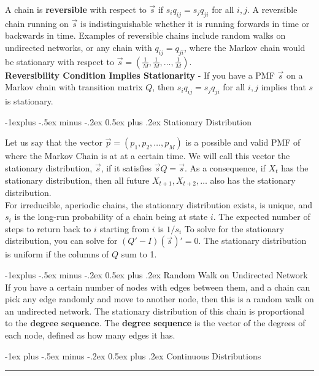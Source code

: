 \documentclass[10pt,landscape]{article}
\makeatletter
\renewcommand{\section}{\@startsection{section}{1}{0mm}%
                                {-1ex plus -.5ex minus -.2ex}%
                                {0.5ex plus .2ex}%
                                {\normalfont\large\bfseries}}
\renewcommand{\subsection}{\@startsection{subsection}{2}{0mm}%
                                {-1explus -.5ex minus -.2ex}%
                                {0.5ex plus .2ex}%
                                {\normalfont\normalsize\bfseries}}
\makeatother
\begin{document}
\begin{multicols}{3}
A chain is \textbf{reversible} with respect to $\vec{s}$ if $s_iq_{ij} = s_jq_{ji}$ for all $i, j$.  A reversible chain running on $\vec{s}$ is indistinguishable whether it is running forwards in time or backwards in time. Examples of reversible chains include random walks on undirected networks, or any chain with $q_{ij} = q_{ji}$, where the Markov chain would be stationary with respect to $\vec{s} = (\frac{1}{M}, \frac{1}{M}, \dots, \frac{1}{M})$. \\

\textbf{Reversibility Condition Implies Stationarity} - If you have a PMF $\vec{s}$ on a Markov chain with transition matrix $Q$, then $s_iq_{ij} = s_jq_{ji}$ for all $i, j$ implies that $s$ is stationary.


\subsection{Stationary Distribution}

Let us say that the vector $\vec{p} = (p_1, p_2, \dots, p_M)$ is a possible and valid PMF of where the Markov Chain is at at a certain time. We will call this vector the stationary distribution, $\vec{s}$, if it satisfies $\vec{s}Q = \vec{s}$. As a consequence, if $X_t$ has the stationary distribution, then all future $X_{t+1}, X_{t + 2}, \dots$ also has the stationary distribution. \\

For irreducible, aperiodic chains, the stationary distribution exists, is unique, and $s_i$ is the long-run probability of a chain being at state $i$. The expected number of steps to return back to $i$ starting from $i$ is $1/s_i$ To solve for the stationary distribution, you can solve for $(Q' - I)(\vec{s})' = 0$. The stationary distribution is uniform if the columns of $Q$ sum to 1.


\subsection{Random Walk on Undirected Network}
If you have a certain number of nodes with edges between them, and a chain can pick any edge randomly and move to another node, then this is a random walk on an undirected network. The stationary distribution of this chain is proportional to the $\textbf{degree sequence}.$ The \textbf{degree sequence} is the vector of the degrees of each node, defined as how many edges it has.

\section{Continuous Distributions}\smallskip \hrule height 2pt \smallskip


\end{multicols}
\end{document}

